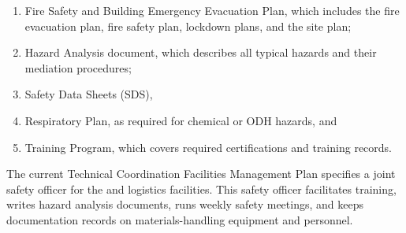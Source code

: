 \begin{enumerate}
\item	Fire Safety and Building Emergency Evacuation Plan, which includes the fire evacuation plan, fire safety plan,  lockdown plans, and the site plan;
\item	Hazard Analysis document, which describes all typical hazards and their mediation %
procedures; 
\item	%
Safety Data Sheets (SDS), 
\item	Respiratory Plan, as required for chemical or ODH hazards, and 
\item	Training Program, which covers required certifications and  training records.
\end{enumerate}

The current Technical Coordination Facilities Management Plan  specifies a joint safety officer for %
the  and logistics facilities. This safety officer facilitates training, writes hazard analysis documents, runs weekly safety meetings, and keeps documentation records on materials-handling equipment and personnel. 





